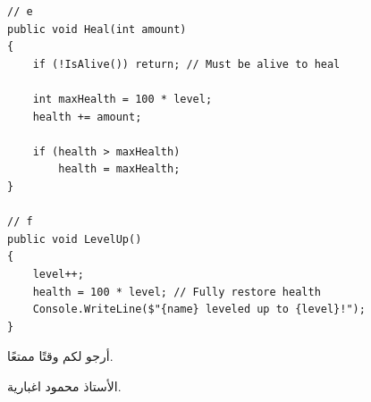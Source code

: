 \documentclass[14pt]{extarticle}
\begin{document}
\begin{enumerate}[itemsep=2em]
\begin{enumerate} [itemsep=1em]
    \ifwithsols
    \begin{boxSolution}
    \begin{english}
    \begin{verbatim}
// e
public void Heal(int amount)
{
    if (!IsAlive()) return; // Must be alive to heal

    int maxHealth = 100 * level;
    health += amount;

    if (health > maxHealth)
        health = maxHealth;
}

// f
public void LevelUp()
{
    level++;
    health = 100 * level; // Fully restore health
    Console.WriteLine($"{name} leveled up to {level}!");
}
    \end{verbatim}
    \end{english}
    \end{boxSolution}
    \fi

\end{enumerate}
\end{enumerate}

\vspace{1cm}
\begin{flushleft}
أرجو لكم وقتًا ممتعًا.

الأستاذ محمود اغبارية.
\end{flushleft}
\end{document}
